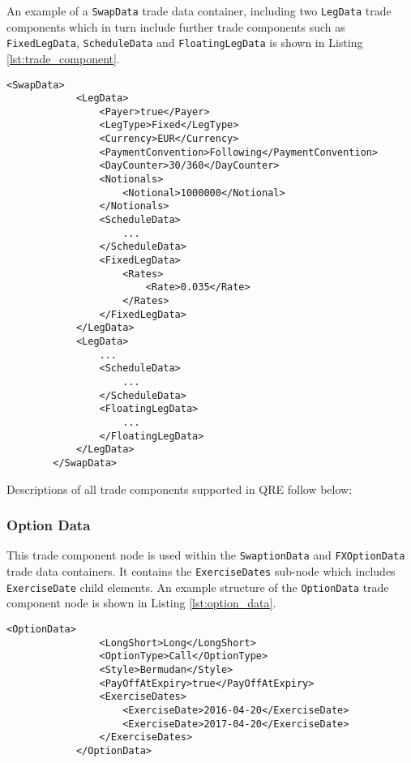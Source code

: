 \vspace{1em}

An example of a \lstinline!SwapData! trade data container, including two \lstinline!LegData! trade components which in turn include further trade components such as \lstinline!FixedLegData!, \lstinline!ScheduleData! and \lstinline!FloatingLegData! is shown in Listing \ref{lst:trade_component}.

{\footnotesize
\begin{lstlisting}[caption=Trade Components Example, label=lst:trade_component]
        <SwapData>
            <LegData>
                <Payer>true</Payer>
                <LegType>Fixed</LegType>
                <Currency>EUR</Currency>
                <PaymentConvention>Following</PaymentConvention>
                <DayCounter>30/360</DayCounter>
                <Notionals>
                    <Notional>1000000</Notional>
                </Notionals>
                <ScheduleData>
                	...
                </ScheduleData>
                <FixedLegData>
                    <Rates>
                        <Rate>0.035</Rate>
                    </Rates>
                </FixedLegData>
            </LegData>
            <LegData>
            	...
                <ScheduleData>
                	...
                </ScheduleData>
                <FloatingLegData>
                	...
                </FloatingLegData>
            </LegData>
        </SwapData>
 \end{lstlisting}
}

Descriptions of all trade components supported in QRE follow below:

\subsubsection{Option Data}
\label{ss:option_data} 
This trade component node is used within the \lstinline!SwaptionData! and \lstinline!FXOptionData! trade data containers. It contains the \lstinline!ExerciseDates! sub-node which includes  \lstinline!ExerciseDate! child elements. An example structure of the \lstinline!OptionData! trade component node is shown in Listing \ref{lst:option_data}.

{\footnotesize
\begin{lstlisting}[caption=OptionData, label=lst:option_data]
            <OptionData>
                <LongShort>Long</LongShort>
                <OptionType>Call</OptionType>
                <Style>Bermudan</Style>
                <PayOffAtExpiry>true</PayOffAtExpiry>
                <ExerciseDates>
                    <ExerciseDate>2016-04-20</ExerciseDate>
                    <ExerciseDate>2017-04-20</ExerciseDate>
                </ExerciseDates>
            </OptionData>
\end{lstlisting}
}

